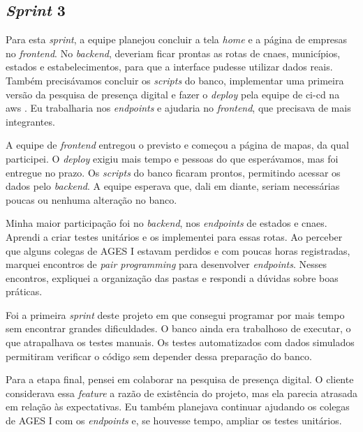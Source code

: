 \subsection{\textit{Sprint} 3}

Para esta \textit{sprint}, a equipe planejou concluir a tela \textit{home} e a
página de empresas no \textit{frontend}. No \textit{backend}, deveriam ficar
prontas as rotas de \ac{cnae}s, municípios, estados e estabelecimentos, para que
a interface pudesse utilizar dados reais. Também precisávamos concluir os
\textit{scripts} do banco, implementar uma primeira versão da pesquisa de
presença digital e fazer o \textit{deploy} pela equipe de \ac{ci-cd} na \ac{aws}
\cite{aws-docs}. Eu trabalharia nos \textit{endpoints} e ajudaria no
\textit{frontend}, que precisava de mais integrantes.

A equipe de \textit{frontend} entregou o previsto e começou a página de mapas,
da qual participei. O \textit{deploy} exigiu mais tempo e pessoas do que
esperávamos, mas foi entregue no prazo. Os \textit{scripts} do banco ficaram
prontos, permitindo acessar os dados pelo \textit{backend}. A equipe esperava
que, dali em diante, seriam necessárias poucas ou nenhuma alteração no banco.

Minha maior participação foi no \textit{backend}, nos \textit{endpoints} de
estados e \ac{cnae}s. Aprendi a criar testes unitários e os implementei para
essas rotas. Ao perceber que alguns colegas de AGES I estavam perdidos e com
poucas horas registradas, marquei encontros de \textit{pair programming} para
desenvolver \textit{endpoints}. Nesses encontros, expliquei a organização das
pastas e respondi a dúvidas sobre boas práticas.

Foi a primeira \textit{sprint} deste projeto em que consegui programar por mais
tempo sem encontrar grandes dificuldades. O banco ainda era trabalhoso de
executar, o que atrapalhava os testes manuais. Os testes automatizados com dados
simulados permitiram verificar o código sem depender dessa preparação do banco.

Para a etapa final, pensei em colaborar na pesquisa de presença digital. O cliente
considerava essa \textit{feature} a razão de existência do projeto, mas ela parecia
atrasada em relação às expectativas. Eu também planejava continuar ajudando os
colegas de AGES I com os \textit{endpoints} e, se houvesse tempo, ampliar os testes
unitários.
